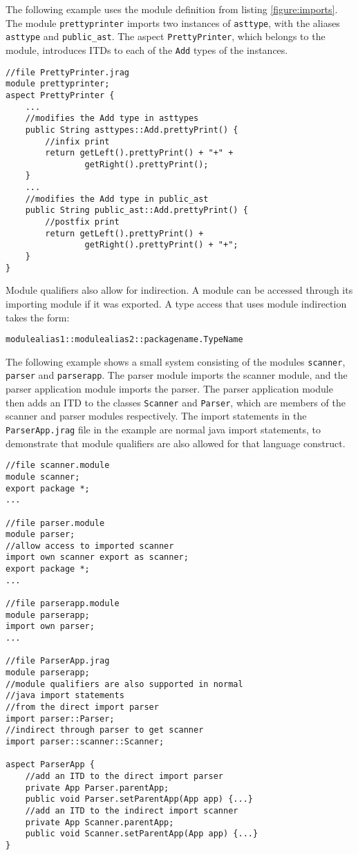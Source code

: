 The following example uses the module definition from listing \ref{figure:imports}.
The module \texttt{prettyprinter} imports two instances of \texttt{asttype}, with the
aliases \texttt{asttype} and \texttt{public\_ast}. The aspect \texttt{PrettyPrinter},
which belongs to the module, introduces ITDs to each of the \texttt{Add} types
of the instances.

\begin{lstlisting}[caption={Module Qualfiers}]
//file PrettyPrinter.jrag
module prettyprinter;
aspect PrettyPrinter {
	...
	//modifies the Add type in asttypes
	public String asttypes::Add.prettyPrint() {
		//infix print
		return getLeft().prettyPrint() + "+" + 
				getRight().prettyPrint();
	}
	...
	//modifies the Add type in public_ast
	public String public_ast::Add.prettyPrint() {
		//postfix print
		return getLeft().prettyPrint() + 
				getRight().prettyPrint() + "+";
	}
}
\end{lstlisting}

Module qualifiers also allow for indirection. A module can be accessed 
through its importing module if it was exported. A type access
that uses module indirection takes the form:

\begin{lstlisting}
modulealias1::modulealias2::packagename.TypeName
\end{lstlisting}

The following example
shows a small system consisting of the modules \texttt{scanner}, 
\texttt{parser} and \texttt{parserapp}. The parser module imports
the scanner module, and the parser application module imports the
parser. The parser application module then adds an ITD to the classes
\texttt{Scanner} and \texttt{Parser}, which are members of the scanner
and parser modules respectively. The import statements in the 
\texttt{ParserApp.jrag} file in the example are normal java import
statements, to demonstrate that module qualifiers are also allowed
for that language construct.

\begin{lstlisting}
//file scanner.module
module scanner;
export package *;
...

//file parser.module
module parser;
//allow access to imported scanner
import own scanner export as scanner;
export package *;
...

//file parserapp.module
module parserapp;
import own parser;
...

//file ParserApp.jrag
module parserapp;
//module qualifiers are also supported in normal
//java import statements
//from the direct import parser
import parser::Parser;
//indirect through parser to get scanner
import parser::scanner::Scanner;

aspect ParserApp {
	//add an ITD to the direct import parser
	private App Parser.parentApp;
	public void Parser.setParentApp(App app) {...}
	//add an ITD to the indirect import scanner
	private App Scanner.parentApp;
	public void Scanner.setParentApp(App app) {...}
}
\end{lstlisting}

